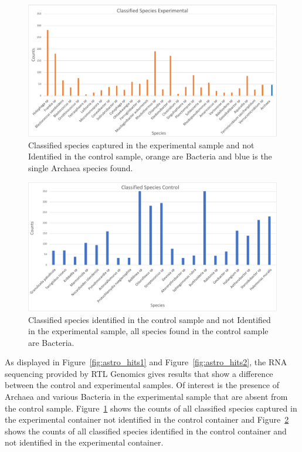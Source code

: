 		\begin{figure}[H]
	\begin{center}
	\includegraphics[width=1\textwidth]{./Figures/ClassifiedExp.pdf}
	\caption{Classified species captured in the experimental sample and not Identified in the control sample, orange are Bacteria and blue is the single Archaea species found.}
	\label{fig:astro_hits3}
	\end{center}
	\end{figure} 

	\begin{figure}[H]
	\begin{center}
	\includegraphics[width=1\textwidth]{./Figures/ClassifiedCon.pdf}
	\caption{Classified species identified in the control sample and not Identified in the experimental sample, all species found in the control sample are Bacteria.}
	\label{fig:astro_hits4}
	\end{center}
	\end{figure} 

	
As displayed in Figure~\ref{fig:astro_hits1} and Figure~\ref{fig:astro_hits2}, the RNA sequencing provided by RTL Genomics gives results that show a difference between the control and experimental samples.  Of interest is the presence of Archaea and various Bacteria in the experimental sample that are absent from the control sample.
Figure~\ref{fig:astro_hits3} shows the counts of all classified species captured in the experimental container not identified in the control container and Figure~\ref{fig:astro_hits4} shows the counts of all classified species identified in the control container and not identified in the experimental container.



